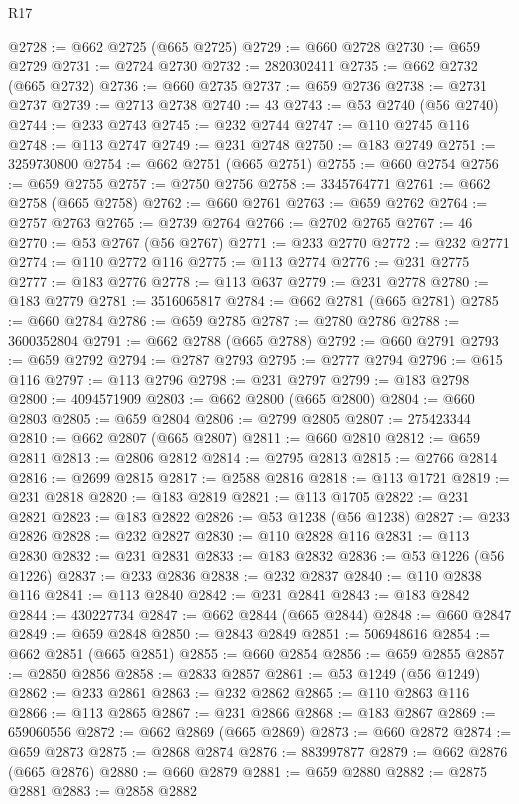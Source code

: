 \begin{lexlean}{R17}
\begin{coremodule}
{{{{{{{{{{{{{{{{{{{{{{{{{{{{{{{{{{{{{{{{{{{{{{{{{{{{{{{{{{{{{{{{{{{{{{{{{{{{{{{{{{{{{@2728 := @662 @2725 (@665 @2725)
@2729 := @660 @2728
@2730 := @659 @2729
@2731 := @2724 @2730
@2732 := 2820302411
@2735 := @662 @2732 (@665 @2732)
@2736 := @660 @2735
@2737 := @659 @2736
@2738 := @2731 @2737
@2739 := @2713 @2738
@2740 := 43
@2743 := @53 @2740 (@56 @2740)
@2744 := @233 @2743
@2745 := @232 @2744
@2747 := @110 @2745 @116
@2748 := @113 @2747
@2749 := @231 @2748
@2750 := @183 @2749
@2751 := 3259730800
@2754 := @662 @2751 (@665 @2751)
@2755 := @660 @2754
@2756 := @659 @2755
@2757 := @2750 @2756
@2758 := 3345764771
@2761 := @662 @2758 (@665 @2758)
@2762 := @660 @2761
@2763 := @659 @2762
@2764 := @2757 @2763
@2765 := @2739 @2764
@2766 := @2702 @2765
@2767 := 46
@2770 := @53 @2767 (@56 @2767)
@2771 := @233 @2770
@2772 := @232 @2771
@2774 := @110 @2772 @116
@2775 := @113 @2774
@2776 := @231 @2775
@2777 := @183 @2776
@2778 := @113 @637
@2779 := @231 @2778
@2780 := @183 @2779
@2781 := 3516065817
@2784 := @662 @2781 (@665 @2781)
@2785 := @660 @2784
@2786 := @659 @2785
@2787 := @2780 @2786
@2788 := 3600352804
@2791 := @662 @2788 (@665 @2788)
@2792 := @660 @2791
@2793 := @659 @2792
@2794 := @2787 @2793
@2795 := @2777 @2794
@2796 := @615 @116
@2797 := @113 @2796
@2798 := @231 @2797
@2799 := @183 @2798
@2800 := 4094571909
@2803 := @662 @2800 (@665 @2800)
@2804 := @660 @2803
@2805 := @659 @2804
@2806 := @2799 @2805
@2807 := 275423344
@2810 := @662 @2807 (@665 @2807)
@2811 := @660 @2810
@2812 := @659 @2811
@2813 := @2806 @2812
@2814 := @2795 @2813
@2815 := @2766 @2814
@2816 := @2699 @2815
@2817 := @2588 @2816
@2818 := @113 @1721
@2819 := @231 @2818
@2820 := @183 @2819
@2821 := @113 @1705
@2822 := @231 @2821
@2823 := @183 @2822
@2826 := @53 @1238 (@56 @1238)
@2827 := @233 @2826
@2828 := @232 @2827
@2830 := @110 @2828 @116
@2831 := @113 @2830
@2832 := @231 @2831
@2833 := @183 @2832
@2836 := @53 @1226 (@56 @1226)
@2837 := @233 @2836
@2838 := @232 @2837
@2840 := @110 @2838 @116
@2841 := @113 @2840
@2842 := @231 @2841
@2843 := @183 @2842
@2844 := 430227734
@2847 := @662 @2844 (@665 @2844)
@2848 := @660 @2847
@2849 := @659 @2848
@2850 := @2843 @2849
@2851 := 506948616
@2854 := @662 @2851 (@665 @2851)
@2855 := @660 @2854
@2856 := @659 @2855
@2857 := @2850 @2856
@2858 := @2833 @2857
@2861 := @53 @1249 (@56 @1249)
@2862 := @233 @2861
@2863 := @232 @2862
@2865 := @110 @2863 @116
@2866 := @113 @2865
@2867 := @231 @2866
@2868 := @183 @2867
@2869 := 659060556
@2872 := @662 @2869 (@665 @2869)
@2873 := @660 @2872
@2874 := @659 @2873
@2875 := @2868 @2874
@2876 := 883997877
@2879 := @662 @2876 (@665 @2876)
@2880 := @660 @2879
@2881 := @659 @2880
@2882 := @2875 @2881
@2883 := @2858 @2882
}}}}}}}}}}}}}}}}}}}}}}}}}}}}}}}}}}}}}}}}}}}}}}}}}}}}}}}}}}}}}}}}}}}}}}}}}}}}}}}}}}}}}
\end{coremodule}
\end{lexlean}
